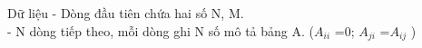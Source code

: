 Dữ liệu  
- Dòng đầu tiên chứa hai số N, M.   
\\   - N dòng tiếp theo, mỗi dòng ghi N số mô tả bảng A. ($A_{ii}$   =0; $A_{ji}$   =$A_{ij}$   )